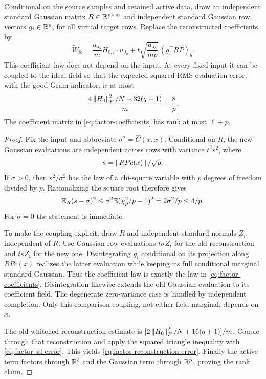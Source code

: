 \begin{lemma}
\label{lem:factor-gaussian}
Conditional on the source samples and retained active data, draw an
independent standard Gaussian matrix $R\in\mathbb R^{p\times m}$ and independent
standard Gaussian row vectors $g_i\in\mathbb R^p$, for all virtual target rows.
Replace the reconstructed coefficients by
\begin{equation}\label{eq:factor-coefficients}
 \widetilde W_{ib}=
   \frac{a_{J_b}}m H_{0,i}\mathbin\cdot u_{J_b}
   +t\sqrt{\frac{a_{J_b}}{mp}}\,(g_i^\top RP)_b.
\end{equation}
This coefficient law does not depend on the input. At every fixed input
it can be coupled to the ideal field so that the expected squared RMS
evaluation error, with the good Gram indicator, is at most
\begin{equation}\label{eq:factor-reconstruction-error}
 \frac{4\left\|H_0\right\|_F^2/N+32(q+1)}m+\frac8p.
\end{equation}
The coefficient matrix in \eqref{eq:factor-coefficients} has rank at most
$\ell+p$.
\end{lemma}
\begin{proof}
Fix the input and abbreviate $\sigma^2=\widehat C(x,x)$.
Conditional on $R$, the new Gaussian evaluations are independent across
rows with variance $t^2s^2$, where
\[
 s=\left\|RPc(x)\right\|/\sqrt p.
\]
If $\sigma>0$, then $s^2/\sigma^2$ has the law of a chi-square variable
with $p$ degrees of freedom divided by $p$. Rationalizing the square root
therefore gives
\begin{equation}\label{eq:factor-sd-error}
 \mathbb E_R(s-\sigma)^2
 \le\sigma^2\mathbb E(\chi_p^2/p-1)^2
 =2\sigma^2/p\le4/p.
\end{equation}
For $\sigma=0$ the statement is immediate.

To make the coupling explicit, draw $R$ and independent standard normals
$Z_i$, independent of $R$. Use Gaussian row evaluations $t\sigma Z_i$
for the old reconstruction and $tsZ_i$ for the new one. Disintegrating
$g_i$ conditional on its projection along $RPc(x)$ realizes the latter
evaluation while keeping its full conditional marginal standard Gaussian.
Thus the coefficient law is exactly the law in
\eqref{eq:factor-coefficients}. Disintegration likewise extends the old
Gaussian evaluation to its coefficient field. The degenerate zero-variance
case is handled by independent completion. Only this comparison coupling,
not either field marginal, depends on $x$.

The old whitened reconstruction estimate is
$[2\left\|H_0\right\|_F^2/N+16(q+1)]/m$. Couple through that reconstruction and
apply the squared triangle inequality with
\eqref{eq:factor-sd-error}. This yields
\eqref{eq:factor-reconstruction-error}. Finally the active term factors
through $\mathbb R^\ell$ and the Gaussian term through $\mathbb R^p$, proving the
rank claim.
\end{proof}

